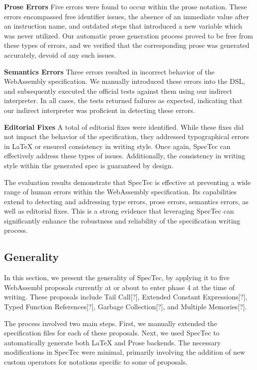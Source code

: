 \textbf{Prose Errors}
Five errors were found to occur within the prose notation. These errors
encompassed free identifier issues, the absence of an immediate value after an
instruction name, and outdated steps that introduced a new variable which was
never utilized. Our automatic prose generation process proved to be free from
these types of errors, and we verified that the corresponding prose was
generated accurately, devoid of any such issues.

\textbf{Semantics Errors}
Three errors resulted in incorrect behavior of the WebAssembly specification.
We manually introduced these errors into the DSL, and subsequently executed the
official tests against them using our indirect interpreter. In all cases, the
tests returned failures as expected, indicating that our indirect interpreter
was proficient in detecting these errors.

\textbf{Editorial Fixes}
A total of  editorial fixes were identified. While these fixes did
not impact the behavior of the specification, they addressed typographical
errors in LaTeX or ensured consistency in writing style. Once again, SpecTec
can effectively address these types of issues.  Additionally, the consistency
in writing style within the generated spec is guaranteed by design.

The evaluation results demonstrate that SpecTec is effective at preventing a wide
range of human errors within the WebAssembly specification.  Its capabilities
extend to detecting and addressing type errors, prose errors, semantics errors,
as well as editorial fixes. This is a strong evidence that leveraging SpecTec
can significantly enhance the robustness and reliability of the specification
writing process.

\subsection{Generality}
In this section, we present the generality of SpecTec, by applying it to five
WebAssembl proposals currently at or about to enter phase 4 at the time of
writing. These proposals include Tail Call[?], Extended Constant
Expressions[?], Typed Function References[?], Garbage Collection[?], and
Multiple Memories[?].

The process involved two main steps. First, we manually extended the
specification files for each of these proposals. Next, we used SpecTec to
automatically generate both LaTeX and Prose backends. The necessary
modifications in SpecTec were minimal, primarily involving the addition of new
custom operators for notations specific to some of proposals.


